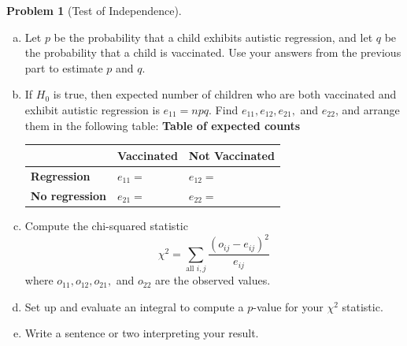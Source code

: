 \documentclass[10pt]{amsart}
\theoremstyle{definition}
\newtheorem{problem}[theorem]{Problem}
\newcommand{\vt}{\vskip 5mm} %
\newcommand{\Fl}{\vt\noindent\textbf} %
\newcommand{\1}[1]{\textbf{1}_{\left[#1\right]}} %
\begin{document}
\begin{problem}[Test of Independence]
\begin{enumerate}[(a)]
\begin{itemize}
    \end{itemize}
    \item Let $p$ be the probability that a child exhibits autistic
    regression, and let $q$ be the probability that a child is vaccinated. Use
    your answers from the previous part to estimate $p$ and $q$.
    \item If $H_{0}$ is true, then expected number of children who are both
    vaccinated and exhibit autistic regression is $e_{11} = npq.$ Find
    $e_{11},e_{12},e_{21},$ and $e_{22}$, and arrange them in the following
    table:
    \Fl{Table of expected counts}
    \begin{center}
      \begin{tabular}{l|l|l|}
        & \textbf{Vaccinated} & \textbf{Not Vaccinated} \\ \hline
        \textbf{Regression}    & $e_{11}=\phantom{\displaystyle\int} $ & $e_{12}=$ \\ \hline
        \textbf{No regression} & $e_{21}=\phantom{\displaystyle\int}$ & $e_{22}=$ \\ \hline
      \end{tabular}
      \vspace{1em}
    \end{center}
    \item Compute the chi-squared statistic
    \begin{equation*}
      \chi^{2} = \sum_{\text{all }i,j} \frac{\left( o_{ij}-e_{ij} \right)^{2} }{e_{ij}} 
    \end{equation*}
    where $o_{11},o_{12},o_{21},$ and $o_{22}$ are the observed values. 
    \item Set up and evaluate an integral to compute a $p$-value for your
    $\chi^{2}$ statistic.
    \item Write a sentence or two interpreting your result.
  \end{enumerate}
\end{problem}
\end{document}
